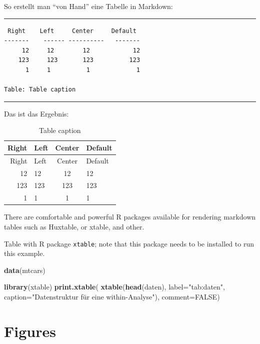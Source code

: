\documentclass[11pt,a4paper,oneside]{article}
\newenvironment{Shaded}{\begin{snugshade}}{\end{snugshade}}
\newcommand{\DataTypeTok}[1]{\textcolor[rgb]{0.13,0.29,0.53}{#1}}
\newcommand{\KeywordTok}[1]{\textcolor[rgb]{0.13,0.29,0.53}{\textbf{#1}}}
\newcommand{\NormalTok}[1]{#1}
\newcommand{\OtherTok}[1]{\textcolor[rgb]{0.56,0.35,0.01}{#1}}
\newcommand{\StringTok}[1]{\textcolor[rgb]{0.31,0.60,0.02}{#1}}
\begin{document}
So erstellt man \enquote{von Hand} eine Tabelle in Markdown:

\begin{center}\rule{0.5\linewidth}{\linethickness}\end{center}

\begin{verbatim}
 Right    Left     Center     Default
-------    ------ ----------   -------
     12     12        12            12
    123     123       123          123
      1     1          1             1
      
Table: Table caption
\end{verbatim}

\begin{center}\rule{0.5\linewidth}{\linethickness}\end{center}

Das ist das Ergebnis:

\begin{longtable}[]{@{}rlcl@{}}
\caption{Table caption}\tabularnewline
\toprule
Right & Left & Center & Default\tabularnewline
\midrule
\endfirsthead
\toprule
Right & Left & Center & Default\tabularnewline
\midrule
\endhead
12 & 12 & 12 & 12\tabularnewline
123 & 123 & 123 & 123\tabularnewline
1 & 1 & 1 & 1\tabularnewline
\bottomrule
\end{longtable}

There are comfortable and powerful R packages available for rendering
markdown tables such as Huxtable, or xtable, and other.

Table with R package \texttt{xtable}; note that this package needs to be
installed to run this example.

\begin{Shaded}
\begin{Highlighting}[]
\KeywordTok{data}\NormalTok{(mtcars)}

\KeywordTok{library}\NormalTok{(xtable)}
\KeywordTok{print.xtable}\NormalTok{(}
  \KeywordTok{xtable}\NormalTok{(}\KeywordTok{head}\NormalTok{(daten), }
         \DataTypeTok{label=}\StringTok{"tab:daten"}\NormalTok{, }
         \DataTypeTok{caption=}\StringTok{"Datenstruktur für eine within-Analyse"}\NormalTok{), }
  \DataTypeTok{comment=}\OtherTok{FALSE}\NormalTok{)}
\end{Highlighting}
\end{Shaded}

\hypertarget{figures}{%
\section{Figures}\label{figures}}
\end{document}
